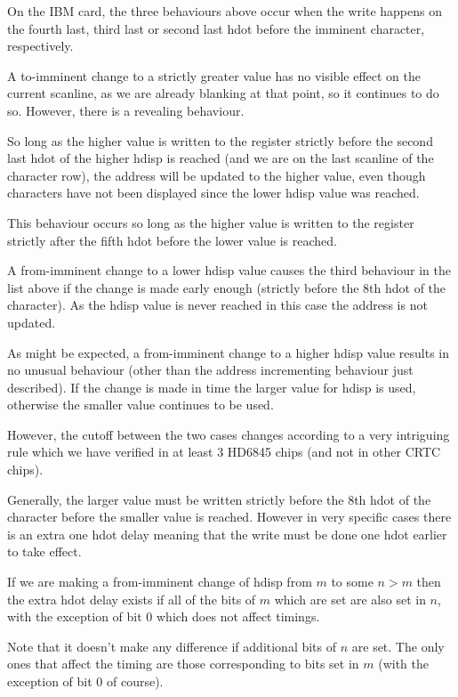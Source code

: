 \documentclass[a4paper,10pt]{amsart}
\begin{document}
On the IBM card, the three behaviours above occur when the write happens on the
fourth last, third last or second last hdot before the imminent character,
respectively.

A to-imminent change to a strictly greater value has no visible effect on the
current scanline, as we are already blanking at that point, so it continues to
do so. However, there is a revealing behaviour.

So long as the higher value is written to the register strictly before the
second last hdot of the higher hdisp is reached (and we are on the last
scanline of the character row), the address will be updated to the higher value,
even though characters have not been displayed since the lower hdisp value was
reached.

This behaviour occurs so long as the higher value is written to the register
strictly after the fifth hdot before the lower value is reached.

A from-imminent change to a lower hdisp value causes the third behaviour in the
list above if the change is made early enough (strictly before the 8th hdot of
the character). As the hdisp value is never reached in this case the address is
not updated.

As might be expected, a from-imminent change to a higher hdisp value results in
no unusual behaviour (other than the address incrementing behaviour just
described). If the change is made in time the larger value for hdisp is used,
otherwise the smaller value continues to be used.

However, the cutoff between the two cases changes according to a very
intriguing rule which we have verified in at least 3 HD6845 chips (and not in
other CRTC chips).

Generally, the larger value must be written strictly before the 8th hdot of the
character before the smaller value is reached. However in very specific cases
there is an extra one hdot delay meaning that the write must be done one hdot
earlier to take effect.

If we are making a from-imminent change of hdisp from $m$ to some $n > m$ then
the extra hdot delay exists if all of the bits of $m$ which are set are also
set in $n$, with the exception of bit $0$ which does not affect timings.

Note that it doesn't make any difference if additional bits of $n$ are set. The
only ones that affect the timing are those corresponding to bits set in $m$
(with the exception of bit $0$ of course).
\end{document}
